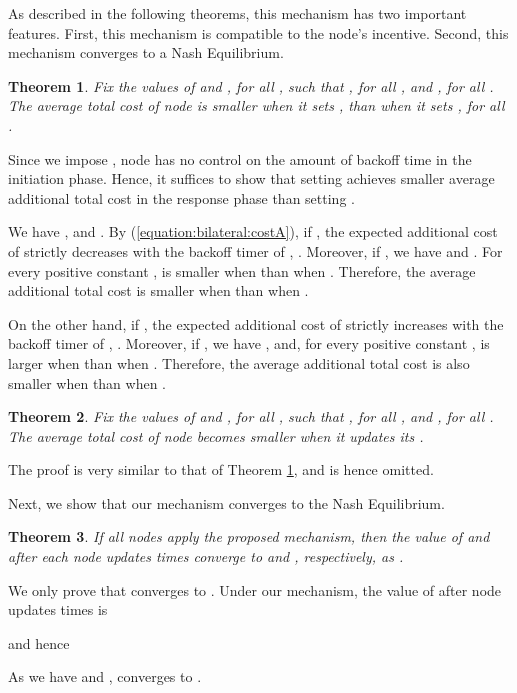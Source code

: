 \documentclass[11pt, conference]{IEEEtran}
\newtheorem{theorem}{Theorem}
\begin{document}
As described in the following theorems, this mechanism has two important features. First, this mechanism is compatible to the node's incentive. Second, this mechanism converges to a Nash Equilibrium. 



\begin{theorem} \label{theorem:distributed:incentiveA}
Fix the values of  and , for all , such that , for all , and , for all . The average total cost of node  is smaller when it sets , than when it sets , for all .
\end{theorem}
\begin{IEEEproof}
Since we impose , node  has no control on the amount of backoff time in the initiation phase. Hence, it suffices to show that setting  achieves smaller average additional total cost in the response phase than setting .

We have , and . By (\ref{equation:bilateral:costA}), if , the expected additional cost of  strictly decreases with the backoff timer of , . Moreover, if , we have  and . For every positive constant ,  is smaller when  than when . Therefore, the average additional total cost is smaller when  than when .

On the other hand, if , the expected additional cost of  strictly increases with the backoff timer of , . Moreover, if , we have , and, for every positive constant ,  is larger when  than when . Therefore, the average additional total cost is also smaller when  than when .
\end{IEEEproof}

\begin{theorem} \label{theorem:distributed:incentiveB}
Fix the values of  and , for all , such that , for all , and , for all . The average total cost of node  becomes smaller when it updates its .
\end{theorem}
\begin{IEEEproof}
The proof is very similar to that of Theorem \ref{theorem:distributed:incentiveA}, and is hence omitted.
\end{IEEEproof}

Next, we show that our mechanism converges to the Nash Equilibrium.

\begin{theorem} \label{theorem:distributed:convergence}
If all nodes apply the proposed mechanism, then the value of  and  after each node updates  times converge to  and , respectively, as .
\end{theorem}
\begin{IEEEproof}
We only prove that  converges to . Under our mechanism, the value of  after node  updates  times is

and hence


As we have  and ,  converges to .
\end{IEEEproof}
\end{document}
